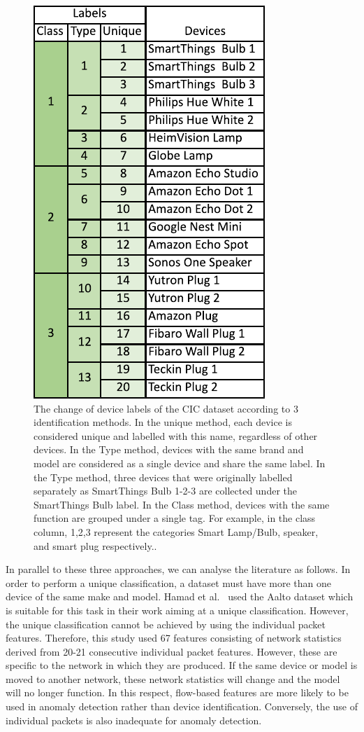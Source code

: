 \documentclass[journal]{IEEEtran}
\begin{document}
\begin{figure}[ht]
	\centerline{\includegraphics[width=0.61\columnwidth]{images/class.pdf}}
	\caption{The change of device labels of the CIC dataset according to 3 identification methods. In the unique method, each device is considered unique and labelled with this name, regardless of other devices. In the Type method, devices with the same brand and model are considered as a single device and share the same label. In the Type method, three devices that were originally labelled separately as SmartThings Bulb 1-2-3 are collected under the SmartThings Bulb label. In the Class method, devices with the same function are grouped under a single tag. For example, in the class column, 1,2,3 represent the categories Smart Lamp/Bulb, speaker, and smart plug respectively..}
	\label{fig:3aproach}
\end{figure}

In parallel to these three approaches, we can analyse the literature as follows. In order to perform a unique classification, a dataset must have more than one device of the same make and model. Hamad et al.\@~\cite{hamad2019iot} used the Aalto dataset which is suitable for this task in their work aiming at a unique classification. However, the unique classification cannot be achieved by using the individual packet features.   Therefore, this study used 67 features consisting of network statistics derived from 20-21 consecutive individual packet features. However, these are specific to the network in which they are produced.  If the same device or model is moved to another network, these network statistics will change and the model will no longer function. In this respect, flow-based features are more likely to be used in anomaly detection rather than device identification. Conversely, the use of individual packets is also inadequate for anomaly detection\cite{kostas2023AD}.
\end{document}
